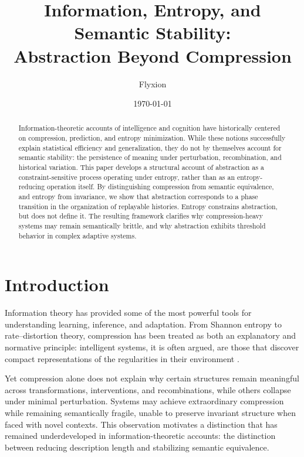 \documentclass[11pt]{article}
\title{Information, Entropy, and Semantic Stability:\\
Abstraction Beyond Compression}
\author{Flyxion}
\date{\today}
\begin{document}
\maketitle

\begin{abstract}
Information-theoretic accounts of intelligence and cognition have historically centered on compression, prediction, and entropy minimization. While these notions successfully explain statistical efficiency and generalization, they do not by themselves account for semantic stability: the persistence of meaning under perturbation, recombination, and historical variation. This paper develops a structural account of abstraction as a constraint-sensitive process operating under entropy, rather than as an entropy-reducing operation itself. By distinguishing compression from semantic equivalence, and entropy from invariance, we show that abstraction corresponds to a phase transition in the organization of replayable histories. Entropy constrains abstraction, but does not define it. The resulting framework clarifies why compression-heavy systems may remain semantically brittle, and why abstraction exhibits threshold behavior in complex adaptive systems.
\end{abstract}

\section{Introduction}

Information theory has provided some of the most powerful tools for understanding learning, inference, and adaptation. From Shannon entropy to rate–distortion theory, compression has been treated as both an explanatory and normative principle: intelligent systems, it is often argued, are those that discover compact representations of the regularities in their environment \cite{shannon1948,coverthomas}.

Yet compression alone does not explain why certain structures remain meaningful across transformations, interventions, and recombinations, while others collapse under minimal perturbation. Systems may achieve extraordinary compression while remaining semantically fragile, unable to preserve invariant structure when faced with novel contexts. This observation motivates a distinction that has remained underdeveloped in information-theoretic accounts: the distinction between reducing description length and stabilizing semantic equivalence.
\end{document}
